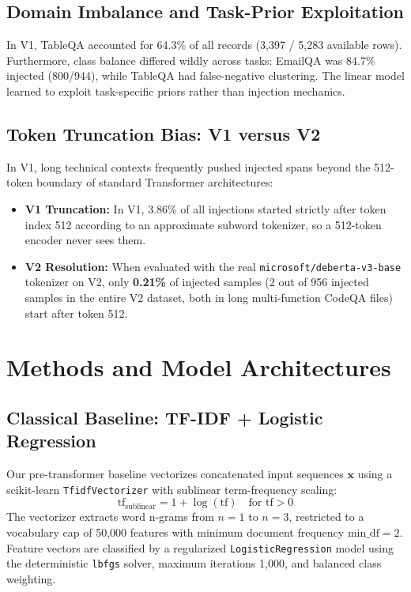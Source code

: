 \documentclass[10pt,conference]{IEEEtran}
\begin{document}
\subsection{Domain Imbalance and Task-Prior Exploitation}
In V1, TableQA accounted for 64.3\% of all records (3,397 / 5,283 available rows). Furthermore, class balance differed wildly across tasks: EmailQA was 84.7\% injected (800/944), while TableQA had false-negative clustering. The linear model learned to exploit task-specific priors rather than injection mechanics.

\subsection{Token Truncation Bias: V1 versus V2}
In V1, long technical contexts frequently pushed injected spans beyond the 512-token boundary of standard Transformer architectures:
\begin{itemize}
    \item \textbf{V1 Truncation:} In V1, 3.86\% of all injections started strictly after token index 512 according to an approximate subword tokenizer, so a 512-token encoder never sees them.
    \item \textbf{V2 Resolution:} When evaluated with the real \texttt{microsoft/deberta-v3-base} tokenizer on V2, only \textbf{0.21\%} of injected samples (2 out of 956 injected samples in the entire V2 dataset, both in long multi-function CodeQA files) start after token 512.
\end{itemize}

\section{Methods and Model Architectures}

\subsection{Classical Baseline: TF-IDF + Logistic Regression}
Our pre-transformer baseline vectorizes concatenated input sequences $\mathbf{x}$ using a scikit-learn \texttt{TfidfVectorizer} with sublinear term-frequency scaling:
\begin{equation}
\text{tf}_{\text{sublinear}} = 1 + \log(\text{tf}) \quad \text{for } \text{tf} > 0
\end{equation}
The vectorizer extracts word n-grams from $n=1$ to $n=3$, restricted to a vocabulary cap of 50,000 features with minimum document frequency $\text{min\_df} = 2$. Feature vectors are classified by a regularized \texttt{LogisticRegression} model using the deterministic \texttt{lbfgs} solver, maximum iterations 1,000, and balanced class weighting.
\end{document}
